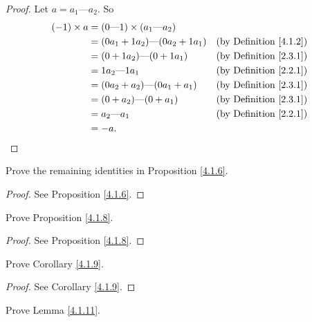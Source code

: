 \begin{proof}
    Let \(a = a_1 \text{---} a_2\).
    So
    \begin{align*}
        (-1) \times a & = (0 \text{---} 1) \times (a_1 \text{---} a_2)                                      \\
                      & = (0a_1 + 1a_2) \text{---} (0a_2 + 1a_1)       & \text{(by Definition \ref{4.1.2})} \\
                      & = (0 + 1a_2) \text{---} (0 + 1a_1)             & \text{(by Definition \ref{2.3.1})} \\
                      & = 1a_2 \text{---} 1a_1                         & \text{(by Definition \ref{2.2.1})} \\
                      & = (0a_2 + a_2) \text{---} (0a_1 + a_1)         & \text{(by Definition \ref{2.3.1})} \\
                      & = (0 + a_2) \text{---} (0 + a_1)               & \text{(by Definition \ref{2.3.1})} \\
                      & = a_2 \text{---} a_1                           & \text{(by Definition \ref{2.2.1})} \\
                      & = -a.
    \end{align*}
\end{proof}

\begin{exercise}\label{ex 4.1.4}
    Prove the remaining identities in Proposition \ref{4.1.6}.
\end{exercise}

\begin{proof}
    See Proposition \ref{4.1.6}.
\end{proof}

\begin{exercise}\label{ex 4.1.5}
    Prove Proposition \ref{4.1.8}.
\end{exercise}

\begin{proof}
    See Proposition \ref{4.1.8}.
\end{proof}

\begin{exercise}\label{ex 4.1.6}
    Prove Corollary \ref{4.1.9}.
\end{exercise}

\begin{proof}
    See Corollary \ref{4.1.9}.
\end{proof}

\begin{exercise}\label{ex 4.1.7}
    Prove Lemma \ref{4.1.11}.
\end{exercise}

